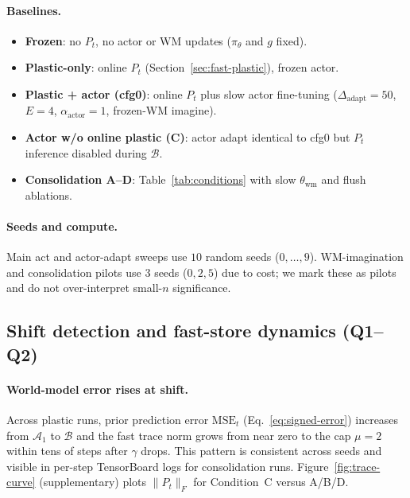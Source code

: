 \paragraph{Baselines.}
\begin{itemize}[leftmargin=*, itemsep=1pt]
  \item \textbf{Frozen}: no $P_t$, no actor or WM updates ($\pi_\theta$ and $g$ fixed).
  \item \textbf{Plastic-only}: online $P_t$ (Section~\ref{sec:fast-plastic}), frozen actor.
  \item \textbf{Plastic + actor (cfg0)}: online $P_t$ plus slow actor fine-tuning ($\Delta_{\mathrm{adapt}}{=}50$, $E{=}4$, $\alpha_{\mathrm{actor}}{=}1$, frozen-WM imagine).
  \item \textbf{Actor w/o online plastic (C)}: actor adapt identical to cfg0 but $P_t$ inference disabled during $\mathcal{B}$.
  \item \textbf{Consolidation A--D}: Table~\ref{tab:conditions} with slow $\theta_{\mathrm{wm}}$ and flush ablations.
\end{itemize}

\paragraph{Seeds and compute.}
Main act and actor-adapt sweeps use $10$ random seeds ($0,\ldots,9$).
WM-imagination and consolidation pilots use $3$ seeds ($0,2,5$) due to cost; we mark these as pilots and do not over-interpret small-$n$ significance.

\subsection{Shift detection and fast-store dynamics (Q1--Q2)}
\label{sec:exp-detection}

\paragraph{World-model error rises at shift.}
Across plastic runs, prior prediction error $\mathrm{MSE}_t$ (Eq.~\eqref{eq:signed-error}) increases from $\mathcal{A}_1$ to $\mathcal{B}$ and the fast trace norm grows from near zero to the cap $\mu=2$ within tens of steps after $\gamma$ drops.
This pattern is consistent across seeds and visible in per-step TensorBoard logs for consolidation runs.
Figure~\ref{fig:trace-curve} (supplementary) plots $\|P_t\|_F$ for Condition~C versus A/B/D.

